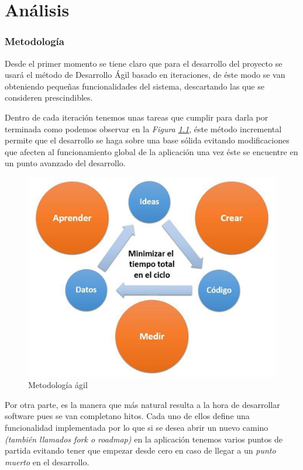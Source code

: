 \chapter{Análisis}

\subsection{Metodología}

Desde el primer momento se tiene claro que para el desarrollo del proyecto se usará el método de Desarrollo Ágil basado en iteraciones, de éste modo se van obteniendo pequeñas funcionalidades del sistema, descartando las que se consideren prescindibles.

Dentro de cada iteración tenemos unas tareas que cumplir para darla por terminada como podemos observar en la \textit{Figura \ref{fig:met_agil}}, éste método incremental permite que el desarrollo se haga sobre una base sólida evitando modificaciones que afecten al funcionamiento global de la aplicación una vez éste se encuentre en un punto avanzado del desarrollo.


\begin{figure}[!ht]
  \begin{center}
    \includegraphics[scale=0.70]{../images/metodologia/agil.png}
    \caption{Metodología ágil}
    \label{fig:met_agil}
  \end{center}
\end{figure}


Por otra parte, es la manera que más natural resulta a la hora de desarrollar software pues se van completano hitos. Cada uno de ellos define una funcionalidad implementada por lo que si se desea abrir un nuevo camino \textit{(también llamados fork o roadmap)} en la aplicación tenemos varios puntos de partida evitando tener que empezar desde cero en caso de llegar a un \textit{punto muerto} en el desarrollo.

